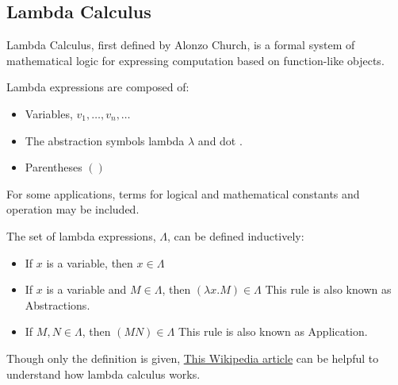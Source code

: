 \documentclass{report}
\begin{document}
			\subsection{Lambda Calculus}
				Lambda Calculus, first defined by Alonzo Church, is a formal system of mathematical logic for expressing computation based on function-like objects.
				\begin{defn} \label{def_lambda_expression}
					Lambda expressions are composed of:
					\begin{itemize}
						\item Variables, $v_1,\dots,v_n,\dots$
						\item The abstraction symbols lambda $\lambda$ and dot $.$
						\item Parentheses $( )$
					\end{itemize}
					For some applications, terms for logical and mathematical constants and operation may be included.
					
					The set of lambda expressions, $\Lambda$, can be defined inductively:
					\begin{itemize}
						\item If $x$ is a variable, then $x \in \Lambda$
						\item If $x$ is a variable and $M \in \Lambda$, then $(\lambda x.M)\in \Lambda$
							\subitem This rule is also known as Abstractions.
						\item If $M,N \in \Lambda$, then $(M N) \in \Lambda$
							\subitem This rule is also known as Application.
					\end{itemize}
				\end{defn}
				Though only the definition is given, \href{https://en.wikipedia.org/wiki/Lambda_calculus#Formal_definition}{This Wikipedia article} can be helpful to understand how lambda calculus works.
			
\end{document}
